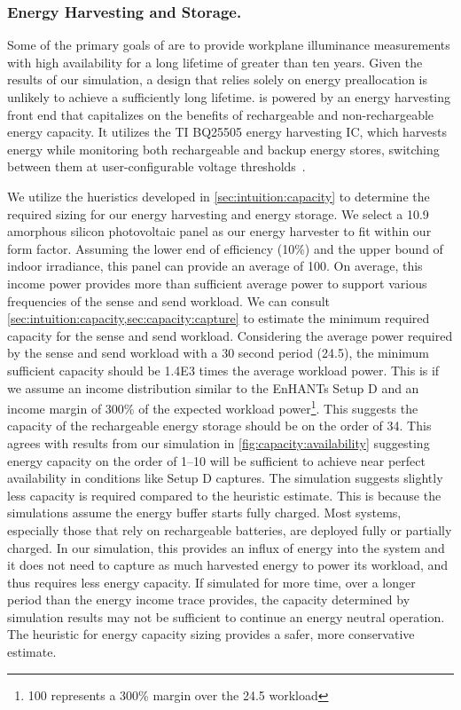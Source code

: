 \subsubsection{Energy Harvesting and Storage.}
Some of the primary goals of \name are to provide workplane illuminance measurements with high availability for a long lifetime of greater than ten years. 
Given the results of our simulation, a design that relies solely on energy preallocation is unlikely to achieve a sufficiently long lifetime. 
\name is powered by an energy harvesting front end that capitalizes on the benefits
of rechargeable and non-rechargeable energy capacity. 
It utilizes the TI BQ25505 energy harvesting IC, which
harvests energy while monitoring both
rechargeable and backup energy stores,
switching between them at user-configurable voltage thresholds~\cite{bq25505}. 

We utilize the hueristics developed in \cref{sec:intuition:capacity} to determine the required sizing for our energy harvesting and energy storage. 
We select a 10.9\ssi{\centi\meter\squared} amorphous
silicon photovoltaic panel as our energy harvester to fit within our form factor.
Assuming the lower end of efficiency (10\%) and the upper bound of indoor irradiance, this panel can provide an average of 100\ssi{\micro\watt}. 
On average, this income power provides more than sufficient average power to support various frequencies of the sense and send workload.
We can consult \cref{sec:intuition:capacity,sec:capacity:capture} to estimate the minimum required capacity for the sense and send workload.
Considering the average power required by the sense and send workload with a 30 second period (24.5\ssi{\micro\watt}), 
the minimum sufficient capacity should be \num{1.4E3} times the average workload power. 
This is if we assume an income distribution similar to the EnHANTs Setup D and an income margin of 300\% of the expected workload power\footnote{100\ssi{\micro\watt} represents a 300\% margin over the 24.5\ssi{\micro\watt} workload}.
This suggests the capacity of the rechargeable energy storage should be on the order of 34\ssi{\milli\Wh}.
This agrees with results from our simulation in \cref{fig:capacity:availability} suggesting energy capacity on the order of 1--10\ssi{\milli\Wh} will be sufficient to achieve near perfect availability in conditions like Setup D captures.
The simulation suggests slightly less capacity is required compared to the heuristic estimate.
This is because the simulations assume the energy buffer starts fully charged.
Most systems, especially those that rely on rechargeable batteries, are deployed fully or partially charged.
In our simulation, this provides an influx of energy into the system and it does not need to capture as much harvested energy to power its workload, and thus requires less energy capacity.
If simulated for more time, over a longer period than the energy income trace provides, the capacity determined by simulation results may not be sufficient to continue an energy neutral operation.
The heuristic for energy capacity sizing provides a safer, more conservative estimate. 

